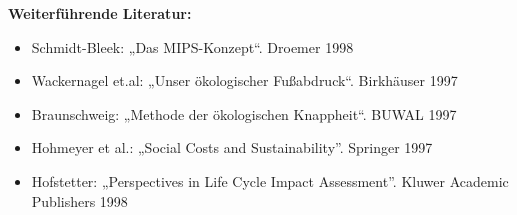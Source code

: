 \begin{course}
\begin{content}
\end{content}



\begin{literature}\textbf{Weiterführende Literatur:}

 \begin{itemize}\item Schmidt-Bleek: „Das MIPS-Konzept“. Droemer 1998  \item Wackernagel et.al: „Unser ökologischer Fußabdruck“. Birkhäuser 1997  \item Braunschweig: „Methode der ökologischen Knappheit“. BUWAL 1997  \item Hohmeyer et al.: „Social Costs and Sustainability”. Springer 1997  \item Hofstetter: „Perspectives in Life Cycle Impact Assessment”. Kluwer Academic Publishers 1998  \end{itemize}\end{literature}



\end{course}